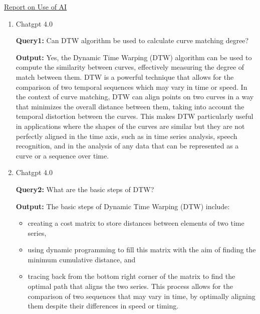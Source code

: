 \documentclass[12pt]{article}  %
\begin{document}
\clearpage
\begin{spacing}{1.2}
    \begin{center}
        {\LARGE \uline{Report on Use of AI}} %
    \end{center}

    \begin{enumerate}
        \item {
            Chatgpt 4.0
            \begin{tcolorbox}[colback=gray!20, boxrule=0pt] %
            \textbf{Query1:} Can DTW algorithm be used to calculate curve matching degree?
            \end{tcolorbox}
            \begin{tcolorbox}[colback=gray!5, boxrule=0pt]
            \textbf{Output:} Yes, the Dynamic Time Warping (DTW) algorithm can be used to compute the similarity between curves, effectively measuring the degree of match between them. DTW is a powerful technique that allows for the comparison of two temporal sequences which may vary in time or speed. In the context of curve matching, DTW can align points on two curves in a way that minimizes the overall distance between them, taking into account the temporal distortion between the curves. This makes DTW particularly useful in applications where the shapes of the curves are similar but they are not perfectly aligned in the time axis, such as in time series analysis, speech recognition, and in the analysis of any data that can be represented as a curve or a sequence over time.
            \end{tcolorbox}
        }

        \item {
            Chatgpt 4.0
                \begin{tcolorbox}[colback=gray!20, boxrule=0pt] %
                \textbf{Query2:} What are the basic steps of DTW?
                \end{tcolorbox}

                \begin{tcolorbox}[colback=gray!5, boxrule=0pt]
                \textbf{Output:} The basic steps of Dynamic Time Warping (DTW) include: 
                    \begin{itemize}
                        \item creating a cost matrix to store distances between elements of two time series, 
                        \item using dynamic programming to fill this matrix with the aim of finding the minimum cumulative distance, and 
                        \item tracing back from the bottom right corner of the matrix to find the optimal path that aligns the two series. This process allows for the comparison of two sequences that may vary in time, by optimally aligning them despite their differences in speed or timing.
                    \end{itemize}
                \end{tcolorbox}
        }


\end{enumerate}
\end{spacing}
\end{document}
